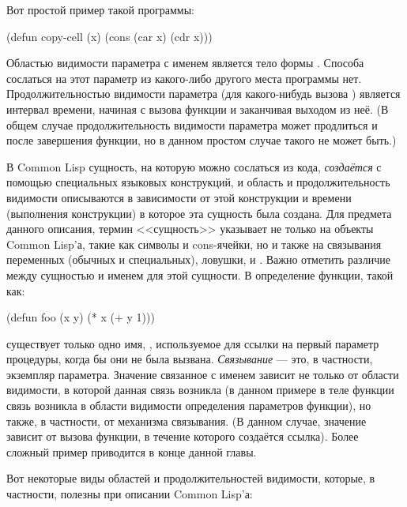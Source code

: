 Вот простой пример такой программы:
\begin{lisp}
(defun copy-cell (x) (cons (car x) (cdr x)))
\end{lisp}

Областью видимости параметра с именем  является тело формы .
Способа сослаться на этот параметр из какого-либо другого места программы
нет. Продолжительностью видимости параметра  (для какого-нибудь вызова
) является интервал времени, начиная с вызова функции и заканчивая
выходом из неё. (В общем случае продолжительность видимости параметра может
продлиться и после завершения функции, но в данном простом случае такого не
может быть.) 

В Common Lisp сущность, на которую можно сослаться из кода, \emph{создаётся} с
помощью специальных языковых конструкций, и область и продолжительность
видимости описываются в зависимости от этой конструкции и времени (выполнения
конструкции) в которое эта сущность была создана.
Для предмета данного описания, термин <<сущность>> указывает не только на
объекты Common Lisp'а, такие как символы и cons-ячейки, но и также на связывания
переменных (обычных и специальных), ловушки, и . Важно
отметить различие между сущностью и именем для этой сущности. В определение
функции, такой как:

\begin{lisp}
(defun foo (x y) (* x (+ y 1)))
\end{lisp}

существует только одно имя, , используемое для ссылки на первый параметр
процедуры, когда бы они не была вызвана. \emph{Связывание} --- это, в частности,
экземпляр параметра. Значение связанное с именем  зависит не только от
области видимости, в которой данная связь возникла (в данном примере в теле
функции  связь возникла в области видимости определения параметров
функции), но также, в частности, от механизма связывания. (В данном случае,
значение зависит от вызова функции, в течение которого создаётся ссылка). Более
сложный пример приводится в конце данной главы. 

Вот некоторые виды областей и продолжительностей видимости, которые, в частности,
полезны при описании Common Lisp'а:

